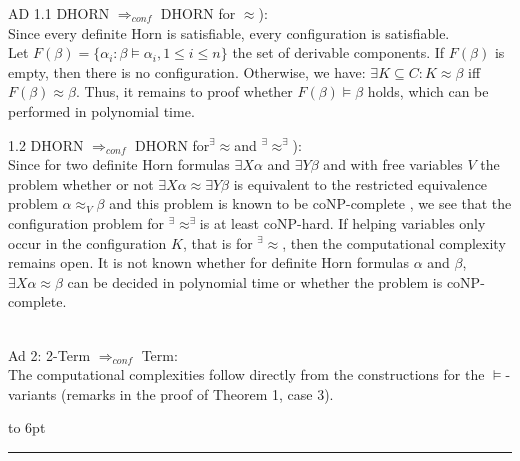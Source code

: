 \documentclass[12pt]{article}
\newcommand{\AM}{\mbox{$^\exists\!\!\models$}}
\newcommand{\AEQB}{\mbox{$^\exists\!\!\approx^\exists$}}
\newcommand{\AEQ}{\mbox{$^\exists\!\!\approx$}}
\newenvironment{proof}{\parindent=0pt{\bf Proof: }}{
   \hspace*{\fill}\hbox to 6pt{\leaders\hrule width 6pt height 6pt\hfill}\par}
\begin{document}
\begin{proof}
AD 1.1 DHORN $\Rightarrow_{conf}$ DHORN for $\approx$):\\
Since every definite Horn is satisfiable, every configuration is satisfiable.\\
Let $F(\beta) =\{\alpha_i: \beta \models \alpha_i, 1 \leq i \leq n\}$ the set of derivable components.
If $F(\beta)$ is empty, then there is no configuration. Otherwise, we
have: $\exists K \subseteq C: K \approx \beta$ iff $F(\beta) \approx \beta$. Thus, it remains to proof whether $F(\beta) \models \beta$ holds, which can be performed in polynomial time.

1.2 DHORN $\Rightarrow_{conf}$ DHORN for\AEQ and \AEQB):\\
Since for two definite Horn formulas $\exists X \alpha$ and $\exists Y \beta$ and with free variables $V$ the problem whether or
not $\exists X \alpha \approx \exists Y \beta$ is equivalent to the restricted equivalence problem $\alpha \approx_V \beta$ and this problem is known to be coNP-complete \cite{kb}, we see that the configuration problem for \AEQB is at least coNP-hard.
If helping variables only occur in the configuration $K$, that is for \AEQ , then the computational complexity remains open.
It is not known whether for definite Horn formulas $\alpha$ and $ \beta$, $\exists X \alpha \approx \beta$ can be decided in polynomial time or whether the problem is coNP-complete.

%

\ \\

Ad 2: 2-Term $\Rightarrow_{conf}$ Term:\\
The computational complexities follow directly from the constructions for the $\models$-variants (remarks in the proof
of Theorem 1, case 3).
\end{proof}
\end{document}

